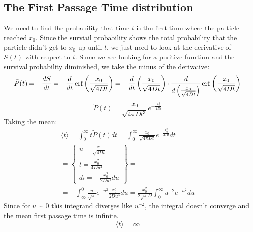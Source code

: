 \documentclass{article}
\begin{document}
\subsection{The First Passage Time distribution}
We need to find the probability that time $t$ is the first time where the particle reached $x_0$. Since the surviail probability shows the total probability that the particle didn't get to $x_0$ up until $t$, we just need to look at the derivative of $S(t)$ with respect to $t$. Since we are looking for a positive function and the survival probability diminished, we take the minus of the derivative:
\begin{equation}
    \tilde{P}(t) = -\frac{dS}{dt} = -\frac{d}{dt} \erf\left(\frac{x_0}{\sqrt{4Dt}}\right) = -\frac{d}{dt}\left(\frac{x_0}{\sqrt{4Dt}}\right) \cdot \frac{d}{d\left(\frac{x_0}{\sqrt{4Dt}}\right)}\erf\left(\frac{x_0}{\sqrt{4Dt}}\right)
\end{equation}
\begin{equation}
    \boxed{\tilde{P}(t) = \frac{x_0}{\sqrt{4\pi Dt^3}} e^{-\frac{x_0^2}{4Dt}}}
\end{equation}
Taking the mean:
\begin{equation}
\begin{gathered}
    \langle t \rangle = \int_0^\infty t\tilde{P}(t) dt = 
    \int_0^\infty \frac{x_0}{\sqrt{4\pi Dt}}e^{-\frac{x_0^2}{4Dt}} dt = \\ = \left\{\begin{matrix}
        u = \frac{x_0}{\sqrt{4Dt}} \\
        t = \frac{x_0^2}{4Du^2} \\
        dt = -\frac{x_0^2}{2Du^3}du
    \end{matrix}\right\} = \\ =
    -\int_\infty^0 \frac{u}{\sqrt{\pi}}e^{-u^2} \frac{x_0^2}{2Du^3}du =
    \frac{x_0^2}{2\sqrt{\pi}D}\int_0^\infty u^{-2} e^{-u^2}du
\end{gathered}
\end{equation}
Since for $u \sim 0$ this integrand diverges like $u^{-2}$, the integral doesn't converge and the mean first passage time is infinite.
\begin{equation}
    \boxed{\langle t \rangle = \infty}
\end{equation}
\end{document}
